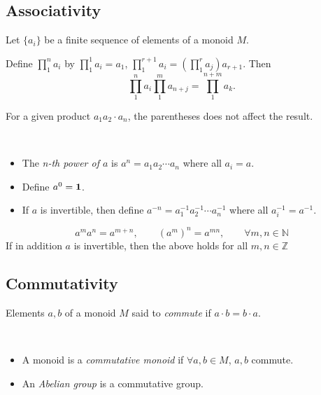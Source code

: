 \subsection*{Associativity} \label{sec:}

Let $\{ a_i \}$ be a finite sequence of elements of a monoid $M$.

\begin{lemma}
Define $\prod_{1}^{n} a_i$ by $\prod_{1}^{1} a_i = a_1$, $\prod_{1}^{r+1} a_i = (\prod_{1}^{r} a_j)a_{r+1}$. Then
$$
\prod_{1}^{n} a_i \prod_{1}^{m} a_{n+j} = \prod_{1}^{n+m} a_k.
$$
\end{lemma}

\begin{remark}
For a given product $a_1 a_2 \cdot a_n$, the parentheses does not affect the result.
\end{remark}

\begin{definition}[Power]~
\begin{itemize}
    \item The \textit{n-th power of $a$} is $a^{n} = a_1a_2\cdots a_n$ where all $a_i = a$.
    \item Define $a^{0} = \mathbf{1}$. 
    \item If $a$ is invertible, then define $a^{-n} = a_1^{-1}a_2^{-1}\cdots a_n^{-1}$ where all $a_i^{-1} = a^{-1}$.
\end{itemize}
\end{definition}

\begin{remark}
$$
a^{m}a^{n} = a^{m+n}, \qquad (a^{m})^{n} = a^{mn}, \qquad \forall m,n \in \mathbb{N}
$$
If in addition $a$ is invertible, then the above holds for all $m,n \in \mathbb{Z}$
\end{remark}

\subsection*{Commutativity} \label{sec:}

\begin{definition}[Commute]
Elements $a,b$ of a monoid $M$ said to \textit{commute}  if $a\cdot b = b\cdot a$.
\end{definition}

\begin{definition} ~
\begin{itemize}
    \item A monoid is a \textit{commutative monoid} if $\forall a,b \in M$, $a,b$ commute.
    \item An \textit{Abelian group} is a commutative group.
\end{itemize}
\end{definition}


